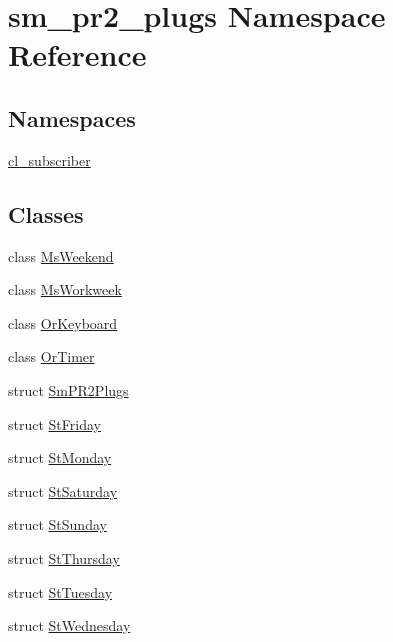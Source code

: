 \hypertarget{namespacesm__pr2__plugs}{}\section{sm\+\_\+pr2\+\_\+plugs Namespace Reference}
\label{namespacesm__pr2__plugs}
\subsection*{Namespaces}
\begin{DoxyCompactItemize}
\item 
 \hyperlink{namespacesm__pr2__plugs_1_1cl__subscriber}{cl\+\_\+subscriber}
\end{DoxyCompactItemize}
\subsection*{Classes}
\begin{DoxyCompactItemize}
\item 
class \hyperlink{classsm__pr2__plugs_1_1MsWeekend}{Ms\+Weekend}
\item 
class \hyperlink{classsm__pr2__plugs_1_1MsWorkweek}{Ms\+Workweek}
\item 
class \hyperlink{classsm__pr2__plugs_1_1OrKeyboard}{Or\+Keyboard}
\item 
class \hyperlink{classsm__pr2__plugs_1_1OrTimer}{Or\+Timer}
\item 
struct \hyperlink{structsm__pr2__plugs_1_1SmPR2Plugs}{Sm\+P\+R2\+Plugs}
\item 
struct \hyperlink{structsm__pr2__plugs_1_1StFriday}{St\+Friday}
\item 
struct \hyperlink{structsm__pr2__plugs_1_1StMonday}{St\+Monday}
\item 
struct \hyperlink{structsm__pr2__plugs_1_1StSaturday}{St\+Saturday}
\item 
struct \hyperlink{structsm__pr2__plugs_1_1StSunday}{St\+Sunday}
\item 
struct \hyperlink{structsm__pr2__plugs_1_1StThursday}{St\+Thursday}
\item 
struct \hyperlink{structsm__pr2__plugs_1_1StTuesday}{St\+Tuesday}
\item 
struct \hyperlink{structsm__pr2__plugs_1_1StWednesday}{St\+Wednesday}
\end{DoxyCompactItemize}
